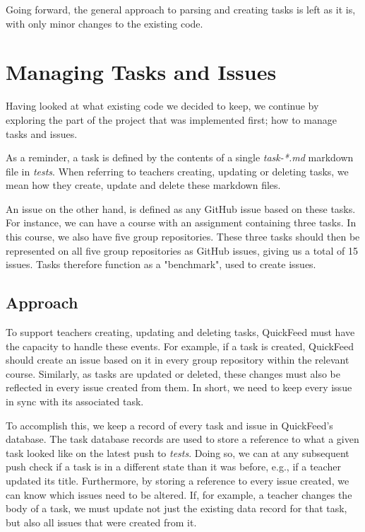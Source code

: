 Going forward, the general approach to parsing and creating tasks is left as it is, with only minor changes to the existing code.

\section{Managing Tasks and Issues}

Having looked at what existing code we decided to keep, we continue by exploring the part of the project that was implemented first; how to manage tasks and issues.

As a reminder, a task is defined by the contents of a single \textit{task-*.md} markdown file in \textit{tests}.
When referring to teachers creating, updating or deleting tasks, we mean how they create, update and delete these markdown files.

An issue on the other hand, is defined as any GitHub issue based on these tasks.
For instance, we can have a course with an assignment containing three tasks.
In this course, we also have five group repositories.
These three tasks should then be represented on all five group repositories as GitHub issues, giving us a total of 15 issues.
Tasks therefore function as a "benchmark", used to create issues.

\subsection{Approach}

To support teachers creating, updating and deleting tasks, QuickFeed must have the capacity to handle these events.
For example, if a task is created, QuickFeed should create an issue based on it in every group repository within the relevant course.
Similarly, as tasks are updated or deleted, these changes must also be reflected in every issue created from them.
In short, we need to keep every issue in sync with its associated task.

To accomplish this, we keep a record of every task and issue in QuickFeed's database.
The task database records are used to store a reference to what a given task looked like on the latest push to \textit{tests}.
Doing so, we can at any subsequent push check if a task is in a different state than it was before, e.g., if a teacher updated its title.
Furthermore, by storing a reference to every issue created, we can know which issues need to be altered.
If, for example, a teacher changes the body of a task, we must update not just the existing data record for that task, but also all issues that were created from it.

